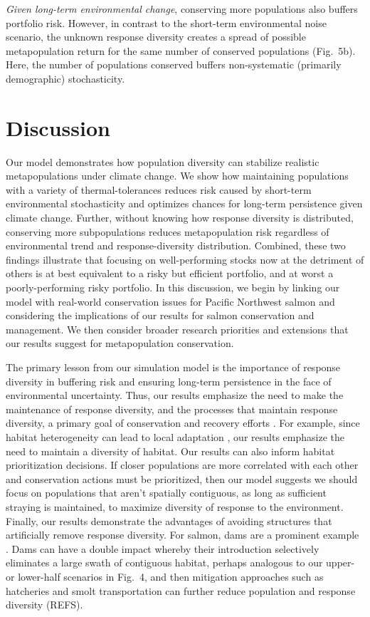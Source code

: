 \emph{Given long-term environmental change}, conserving more populations also buffers portfolio risk. However, in contrast to the short-term environmental noise scenario, the unknown response diversity creates a spread of possible metapopulation return for the same number of conserved populations (Fig.~5b). Here, the number of populations conserved buffers non-systematic (primarily demographic) stochasticity.

\section{Discussion}

Our model demonstrates how population diversity can stabilize realistic metapopulations under climate change. We show how maintaining populations with a variety of thermal-tolerances reduces risk caused by short-term environmental stochasticity and optimizes chances for long-term persistence given climate change. Further, without knowing how response diversity is distributed, conserving more subpopulations reduces metapopulation risk regardless of environmental trend and response-diversity distribution. Combined, these two findings illustrate that focusing on well-performing stocks now at the detriment of others is at best equivalent to a risky but efficient portfolio, and at worst a poorly-performing risky portfolio. In this discussion, we begin by linking our model with real-world conservation issues for Pacific Northwest salmon and considering the implications of our results for salmon conservation and management. We then consider broader research priorities and extensions that our results suggest for metapopulation conservation.

The primary lesson from our simulation model is the importance of response diversity in buffering risk and ensuring long-term persistence in the face of environmental uncertainty. Thus, our results emphasize the need to make the maintenance of response diversity, and the processes that maintain response diversity, a primary goal of conservation and recovery efforts \citep{moore2010}. For example, since habitat heterogeneity can lead to local adaptation \citep{taylor1991, fraser2011}, our results emphasize the need to maintain a diversity of habitat. Our results can also inform habitat prioritization decisions. If closer populations are more correlated with each other and conservation actions must be prioritized, then our model suggests we should focus on populations that aren't spatially contiguous, as long as sufficient straying is maintained, to maximize diversity of response to the environment. Finally, our results demonstrate the advantages of avoiding structures that artificially remove response diversity. For salmon, dams are a prominent example \citep{waples2007, pess2012}. Dams can have a double impact whereby their introduction selectively eliminates a large swath of contiguous habitat, perhaps analogous to our upper- or lower-half scenarios in Fig.~4, and then mitigation approaches such as hatcheries and smolt transportation can further reduce population and response diversity (REFS).

